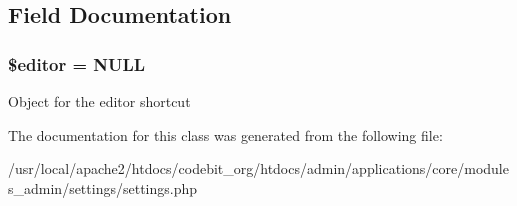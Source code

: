 \subsection{Field Documentation}
\hypertarget{classadmin__core__settings__settings_ae693002b1a41abcb7deb80901cd9aedb}{
\subsubsection[{\$editor}]{\setlength{\rightskip}{0pt plus 5cm}\$editor = N\-U\-L\-L}}\label{classadmin__core__settings__settings_ae693002b1a41abcb7deb80901cd9aedb}
Object for the editor shortcut 

The documentation for this class was generated from the following file\-:\begin{DoxyCompactItemize}
\item 
/usr/local/apache2/htdocs/codebit\-\_\-org/htdocs/admin/applications/core/modules\-\_\-admin/settings/settings.\-php\end{DoxyCompactItemize}
